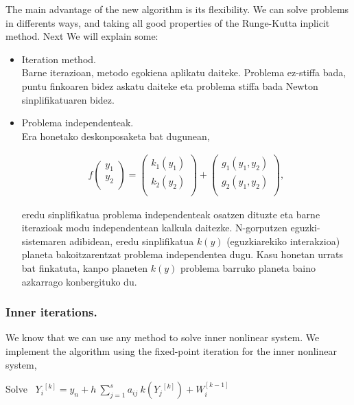 The main advantage of the new algorithm  is its flexibility. We can solve problems in differents ways, and taking all good properties of the Runge-Kutta inplicit method. Next We will explain some:       
\begin{itemize}
  \item Iteration method.\\
  Barne iterazioan, metodo egokiena aplikatu daiteke. Problema ez-stiffa bada, puntu finkoaren bidez askatu daiteke eta problema stiffa bada Newton sinplifikatuaren bidez.
 
  \item Problema independenteak.\\
Era honetako deskonposaketa bat dugunean,

\begin{align*}
f\left ( \begin{array}{c}
   y_1 \\
   y_2 \\
\end{array} \right)=
\left ( \begin{array}{c}
   k_1(y_1) \\
   k_2(y_2) \\
\end{array} \right)+
\left ( \begin{array}{c}
   g_1(y_1,y_2) \\
   g_2(y_1,y_2) \\
\end{array} \right),
\end{align*}

eredu sinplifikatua problema independenteak osatzen dituzte eta barne iterazioak modu independentean kalkula daitezke. N-gorputzen eguzki-sistemaren adibidean, eredu sinplifikatua $k(y)$ (eguzkiarekiko interakzioa) planeta bakoitzarentzat problema independentea dugu. Kasu honetan urrats bat finkatuta, kanpo planeten $k(y)$ problema barruko planeta baino azkarrago konbergituko du. 
\end{itemize}  

\subsubsection*{Inner iterations.}


We know that we can use any method to solve inner nonlinear system. We implement the algorithm using the fixed-point iteration for the inner nonlinear system,

\vspace{5mm} %
 Solve \ ${Y_i}^{[k]}=y_n+h\  \sum^s_{j=1}{a_{ij}\ k\left({Y_j}^{[k]}\right)+W^{[k-1]}_i\ \ \ }$\;
 
